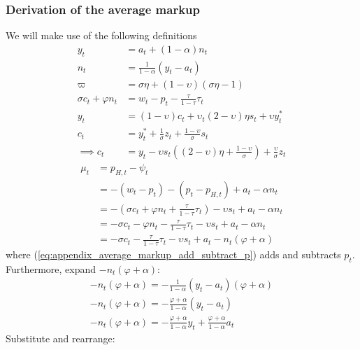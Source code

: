 \subsubsection*{Derivation of the average markup}
We will make use of the following definitions
\begin{align}\label{eq:appendix_average_markup_beginning}
    y_t &= a_t + (1-\alpha)n_t\\
    n_t &= \frac{1}{1-\alpha}(y_t - a_t)\\
    \varpi &= \sigma \eta + (1-\upsilon)(\sigma \eta - 1)\\
    \sigma c_t + \varphi n_t &= w_t - p_t - \frac{\tau}{1-\tau}\tau_t\\
    y_t &= (1-\upsilon)c_t + \upsilon_t(2-\upsilon)\eta s_t + \upsilon y_t^*\\
    c_t &= y_t^* + \frac{1}{\sigma}z_t + \frac{1-\upsilon}{\sigma}s_t\\
    \implies c_t &= y_t - \upsilon s_t \left( (2-\upsilon)\eta + \frac{1-\upsilon}{\sigma}\right) + \frac{\upsilon}{\sigma}z_t
\end{align}
\begin{align}
    \mu_t &= p_{H,t} - \psi_t\\
    &=-(w_t-p_t) - (p_t - p_{H,t}) + a_t - \alpha n_t \label{eq:appendix_average_markup_add_subtract_p}\\
    &= -(\sigma c_t + \varphi n_t + \frac{\tau}{1-\tau}\tau_t) - \upsilon s_t + a_t - \alpha n_t\\
    &= -\sigma c_t - \varphi n_t - \frac{\tau}{1-\tau}\tau_t - \upsilon s_t + a_t - \alpha n_t\\
    &= -\sigma c_t - \frac{\tau}{1-\tau}\tau_t - \upsilon s_t + a_t - n_t(\varphi + \alpha)
\end{align}
where (\ref{eq:appendix_average_markup_add_subtract_p}) adds and subtracts $p_t$. Furthermore, expand $-n_t(\varphi + \alpha)$:
\begin{align}
    -n_t(\varphi + \alpha) = -\frac{1}{1-\alpha}(y_t - a_t)(\varphi + \alpha)\\
    -n_t(\varphi + \alpha) = -\frac{\varphi + \alpha}{1-\alpha}(y_t - a_t)\\
    -n_t(\varphi + \alpha) = -\frac{\varphi + \alpha}{1-\alpha}y_t + \frac{\varphi + \alpha}{1-\alpha}a_t
\end{align}
Substitute and rearrange:
